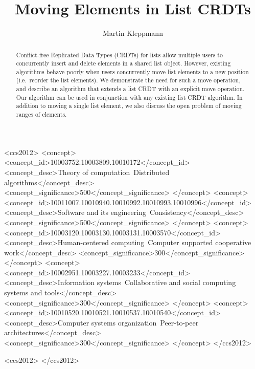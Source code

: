 \documentclass[sigplan,10pt]{acmart}
\begin{document}
\title{Moving Elements in List CRDTs}

\author{Martin Kleppmann}

\begin{abstract}
Conflict-free Replicated Data Types (CRDTs) for lists allow multiple users to concurrently insert and delete elements in a shared list object.
However, existing algorithms behave poorly when users concurrently move list elements to a new position (i.e.\ reorder the list elements).
We demonstrate the need for such a move operation, and describe an algorithm that extends a list CRDT with an explicit move operation.
Our algorithm can be used in conjunction with any existing list CRDT algorithm.
In addition to moving a single list element, we also discuss the open problem of moving ranges of elements.
\end{abstract}

\begin{CCSXML}
<ccs2012>
    <concept>
        <concept_id>10003752.10003809.10010172</concept_id>
        <concept_desc>Theory of computation~Distributed algorithms</concept_desc>
        <concept_significance>500</concept_significance>
    </concept>
    <concept>
        <concept_id>10011007.10010940.10010992.10010993.10010996</concept_id>
        <concept_desc>Software and its engineering~Consistency</concept_desc>
        <concept_significance>500</concept_significance>
    </concept>
    <concept>
        <concept_id>10003120.10003130.10003131.10003570</concept_id>
        <concept_desc>Human-centered computing~Computer supported cooperative work</concept_desc>
        <concept_significance>300</concept_significance>
    </concept>
    <concept>
        <concept_id>10002951.10003227.10003233</concept_id>
        <concept_desc>Information systems~Collaborative and social computing systems and tools</concept_desc>
        <concept_significance>300</concept_significance>
    </concept>
    <concept>
        <concept_id>10010520.10010521.10010537.10010540</concept_id>
        <concept_desc>Computer systems organization~Peer-to-peer architectures</concept_desc>
        <concept_significance>300</concept_significance>
    </concept>
</ccs2012>
\end{CCSXML}

\begin{CCSXML}
<ccs2012>
 </ccs2012>
\end{CCSXML}
\end{document}
